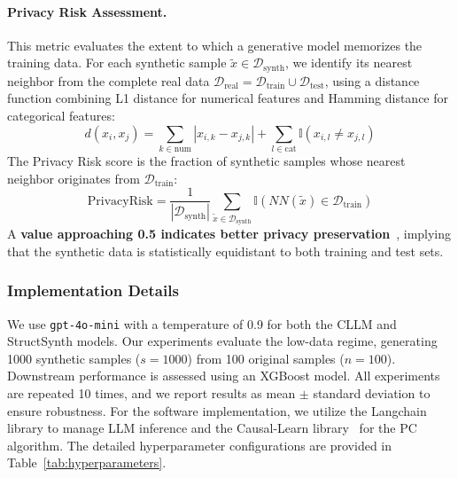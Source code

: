 \paragraph{Privacy Risk Assessment.}
This metric evaluates the extent to which a generative model memorizes the training data. For each synthetic sample $\tilde{x} \in \mathcal{D}_{\text{synth}}$, we identify its nearest neighbor from the complete real data $\mathcal{D}_{\text{real}} = \mathcal{D}_{\text{train}} \cup \mathcal{D}_{\text{test}}$, using a distance function combining L1 distance for numerical features and Hamming distance for categorical features:
\begin{equation}
    d(x_i, x_j) = \sum_{k \in \text{num}} |x_{i,k} - x_{j,k}| + \sum_{l \in \text{cat}} \mathbb{I}(x_{i,l} \neq x_{j,l})
\end{equation}
The Privacy Risk score is the fraction of synthetic samples whose nearest neighbor originates from $\mathcal{D}_{\text{train}}$:
\begin{equation}
    \text{PrivacyRisk} = \frac{1}{|\mathcal{D}_{\text{synth}}|} \sum_{\tilde{x} \in \mathcal{D}_{\text{synth}}} \mathbb{I}(NN(\tilde{x}) \in \mathcal{D}_{\text{train}})
\end{equation}
A \textbf{value approaching 0.5 indicates better privacy preservation}~\cite{van2023membership}, implying that the synthetic data is statistically equidistant to both training and test sets.

\subsubsection{Implementation Details}
\label{sec:implementation}

We use \texttt{gpt-4o-mini} with a temperature of 0.9 for both the CLLM and \textsf{StructSynth} models. Our experiments evaluate the low-data regime, generating 1000 synthetic samples ($s=1000$) from 100 original samples ($n=100$). Downstream performance is assessed using an XGBoost model. All experiments are repeated 10 times, and we report results as mean $\pm$ standard deviation to ensure robustness. For the software implementation, we utilize the Langchain library to manage LLM inference and the Causal-Learn library~\cite{zheng2024causal} for the PC algorithm. The detailed hyperparameter configurations are provided in Table~\ref{tab:hyperparameters}.

